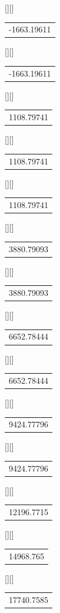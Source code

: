\begin{psfrags}
[][]{\color[rgb]{0,0,0}\setlength{\tabcolsep}{0pt}\begin{tabular}{c}-1663.19611\end{tabular}}%
[][]{\color[rgb]{0,0,0}\setlength{\tabcolsep}{0pt}\begin{tabular}{c}-1663.19611\end{tabular}}%
[][]{\color[rgb]{0,0,0}\setlength{\tabcolsep}{0pt}\begin{tabular}{c}1108.79741\end{tabular}}%
[][]{\color[rgb]{0,0,0}\setlength{\tabcolsep}{0pt}\begin{tabular}{c}1108.79741\end{tabular}}%
[][]{\color[rgb]{0,0,0}\setlength{\tabcolsep}{0pt}\begin{tabular}{c}1108.79741\end{tabular}}%
[][]{\color[rgb]{0,0,0}\setlength{\tabcolsep}{0pt}\begin{tabular}{c}3880.79093\end{tabular}}%
[][]{\color[rgb]{0,0,0}\setlength{\tabcolsep}{0pt}\begin{tabular}{c}3880.79093\end{tabular}}%
[][]{\color[rgb]{0,0,0}\setlength{\tabcolsep}{0pt}\begin{tabular}{c}6652.78444\end{tabular}}%
[][]{\color[rgb]{0,0,0}\setlength{\tabcolsep}{0pt}\begin{tabular}{c}6652.78444\end{tabular}}%
[][]{\color[rgb]{0,0,0}\setlength{\tabcolsep}{0pt}\begin{tabular}{c}9424.77796\end{tabular}}%
[][]{\color[rgb]{0,0,0}\setlength{\tabcolsep}{0pt}\begin{tabular}{c}9424.77796\end{tabular}}%
[][]{\color[rgb]{0,0,0}\setlength{\tabcolsep}{0pt}\begin{tabular}{c}12196.7715\end{tabular}}%
[][]{\color[rgb]{0,0,0}\setlength{\tabcolsep}{0pt}\begin{tabular}{c}14968.765\end{tabular}}%
[][]{\color[rgb]{0,0,0}\setlength{\tabcolsep}{0pt}\begin{tabular}{c}17740.7585\end{tabular}}%

\end{psfrags}
